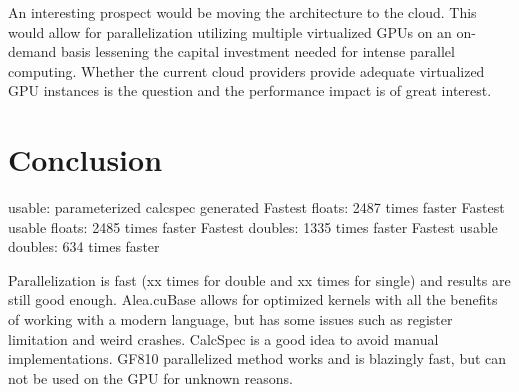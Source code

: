 An interesting prospect would be moving the architecture to the cloud.
This would allow for parallelization utilizing multiple virtualized GPUs on an on-demand basis lessening the capital investment needed for intense parallel computing.
Whether the current cloud providers provide adequate virtualized GPU instances is the question and the performance impact is of great interest.

\section{Conclusion}
usable: parameterized calcspec generated
Fastest floats: 2487 times faster
Fastest usable floats: 2485 times faster
Fastest doubles: 1335 times faster
Fastest usable doubles: 634 times faster

Parallelization is fast (xx times for double and xx times for single) and results are still good enough.
Alea.cuBase allows for optimized kernels with all the benefits of working with a modern language, but has some issues such as register limitation and weird crashes.
CalcSpec is a good idea to avoid manual implementations.
GF810 parallelized method works and is blazingly fast, but can not be used on the GPU for unknown reasons.




